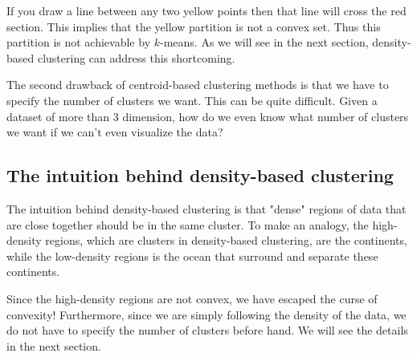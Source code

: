 If you draw a line between any two yellow points then that line will
cross the red section. This implies that the yellow partition is not a convex
set. Thus this partition is not achievable by $k$-means. As we will see
in the next section, density-based clustering can address this shortcoming.

The second drawback of centroid-based clustering methods is that we have
to specify the number of clusters we want. This can be quite difficult. Given
a dataset of more than 3 dimension, how do we even know what number of clusters
we want if we can't even visualize the data?

\subsection{The intuition behind density-based clustering}

The intuition behind density-based clustering is that "dense" regions of data
that are close together should be in the same cluster. To make an analogy,
the high-density regions, which are clusters in density-based clustering, are the continents,
while the low-density regions is the ocean that surround and separate these
continents.

Since the high-density regions are not convex, we have escaped the curse of
convexity! Furthermore, since we are simply following the density of the data,
we do not have to specify the number of clusters before hand. We will see the
details in the next section.
